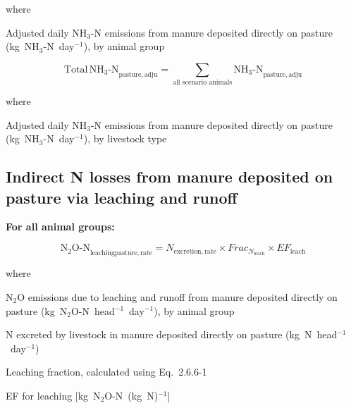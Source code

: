 \noindent where

\begin{description}[font=\normalfont, leftmargin=12em, style=nextline, nosep]
    \item[$\mathrm{NH_3\text{-}N}_{\mathrm{pasture,adju}}$]
        Adjusted daily NH$_3$-N emissions from manure deposited directly on
        pasture (kg~NH$_3$-N~day$^{-1}$), by animal group
\end{description}

\begin{equation}
    \mathrm{Total\,NH_3\text{-}N}_{\mathrm{pasture,adju}}
        = \sum_{\text{all scenario animals}}
          \mathrm{NH_3\text{-}N}_{\mathrm{pasture,adju}}
    \tag{Eq.\ 5.4.3-6}
\end{equation}

\noindent where

\begin{description}[font=\normalfont, leftmargin=12em, style=nextline, nosep]
    \item[$\mathrm{Total\,NH_3\text{-}N}_{\mathrm{pasture,adju}}$]
        Adjusted daily NH$_3$-N emissions from manure deposited directly on
        pasture (kg~NH$_3$-N~day$^{-1}$), by livestock type
\end{description}

\subsection{Indirect N losses from manure deposited on pasture via leaching and runoff}
\label{subsec:grazing-leaching}

\noindent\textbf{For all animal groups:}

\begin{equation}
    \mathrm{N_2O\text{-}N}_{\mathrm{leachingpasture,rate}}
        = N_{\mathrm{excretion,rate}}
          \times \mathit{Frac}_{N_{\mathrm{leach}}}
          \times \mathit{EF}_{\mathrm{leach}}
    \tag{Eq.\ 5.4.4-1}
\end{equation}

\noindent where

\begin{description}[font=\normalfont, leftmargin=12em, style=nextline, nosep]
    \item[$\mathrm{N_2O\text{-}N}_{\mathrm{leachingpasture,rate}}$]
        N$_2$O emissions due to leaching and runoff from manure deposited
        directly on pasture (kg~N$_2$O-N~head$^{-1}$~day$^{-1}$), by animal
        group
    \item[$N_{\mathrm{excretion,rate}}$]
        N excreted by livestock in manure deposited directly on pasture
        (kg~N~head$^{-1}$~day$^{-1}$)
    \item[$\mathit{Frac}_{N_{\mathrm{leach}}}$]
        Leaching fraction, calculated using Eq.~2.6.6-1
    \item[$\mathit{EF}_{\mathrm{leach}}$]
        EF for leaching [kg~N$_2$O-N~(kg~N)$^{-1}$]
\end{description}

